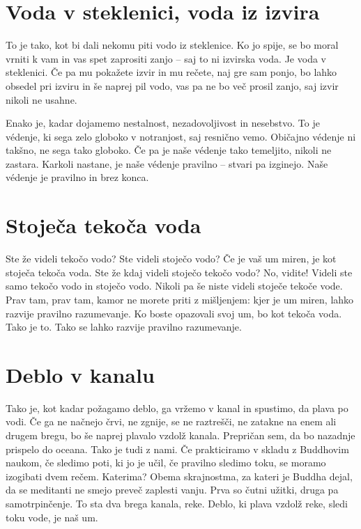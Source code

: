 \section{Voda v steklenici, voda iz izvira}

To je tako, kot bi dali nekomu piti vodo iz steklenice. Ko jo spije, se bo moral vrniti k vam in vas spet zaprositi zanjo – saj to ni izvirska voda. Je voda v steklenici. Če pa mu pokažete izvir in mu rečete, naj gre sam ponjo, bo lahko obsedel pri izviru in še naprej pil vodo, vas pa ne bo več prosil zanjo, saj izvir nikoli ne usahne.

Enako je, kadar dojamemo nestalnost, nezadovoljivost in nesebstvo. To je védenje, ki sega zelo globoko v notranjost, saj resnično vemo. Običajno védenje ni takšno, ne sega tako globoko. Če pa je naše védenje tako temeljito, nikoli ne zastara. Karkoli nastane, je naše védenje pravilno – stvari pa izginejo. Naše védenje je pravilno in brez konca.

\section{Stoječa tekoča voda}

Ste že videli tekočo vodo? Ste videli stoječo vodo? Če je vaš um miren, je kot stoječa tekoča voda. Ste že kdaj videli stoječo tekočo vodo? No, vidite! Videli ste samo tekočo vodo in stoječo vodo. Nikoli pa še niste videli stoječe tekoče vode. Prav tam, prav tam, kamor ne morete priti z mišljenjem: kjer je um miren, lahko razvije pravilno razumevanje. Ko boste opazovali svoj um, bo kot tekoča voda. Tako je to. Tako se lahko razvije pravilno razumevanje.

\section{Deblo v kanalu}

Tako je, kot kadar požagamo deblo, ga vržemo v kanal in spustimo, da plava po vodi. Če ga ne načnejo črvi, ne zgnije, se ne raztrešči, ne zatakne na enem ali drugem bregu, bo še naprej plavalo vzdolž kanala. Prepričan sem, da bo nazadnje prispelo do oceana.
Tako je tudi z nami. Če prakticiramo v skladu z Buddhovim naukom, če sledimo poti, ki jo je učil, če pravilno sledimo toku, se moramo izogibati dvem rečem. Katerima? Obema skrajnostma, za kateri je Buddha dejal, da se meditanti ne smejo preveč zaplesti vanju. Prva so čutni užitki, druga pa samotrpinčenje. To sta dva brega kanala, reke. Deblo, ki plava vzdolž reke, sledi toku vode, je naš um.

